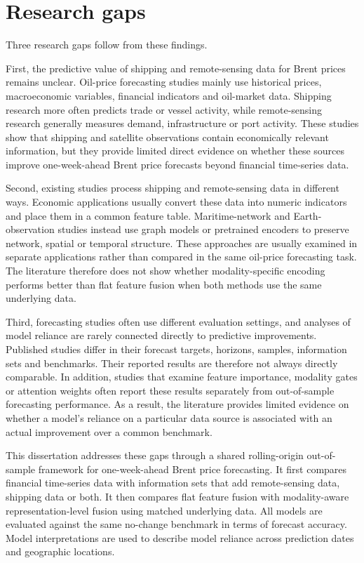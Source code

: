 \documentclass[
  british,
  12pt,
  oneside]{book}
\begin{document}
\section{Research gaps}\label{lit-gaps}

Three research gaps follow from these findings.

First, the predictive value of shipping and remote-sensing data for Brent prices remains unclear. Oil-price forecasting studies mainly use historical prices, macroeconomic variables, financial indicators and oil-market data. Shipping research more often predicts trade or vessel activity, while remote-sensing research generally measures demand, infrastructure or port activity. These studies show that shipping and satellite observations contain economically relevant information, but they provide limited direct evidence on whether these sources improve one-week-ahead Brent price forecasts beyond financial time-series data.

Second, existing studies process shipping and remote-sensing data in different ways. Economic applications usually convert these data into numeric indicators and place them in a common feature table. Maritime-network and Earth-observation studies instead use graph models or pretrained encoders to preserve network, spatial or temporal structure. These approaches are usually examined in separate applications rather than compared in the same oil-price forecasting task. The literature therefore does not show whether modality-specific encoding performs better than flat feature fusion when both methods use the same underlying data.

Third, forecasting studies often use different evaluation settings, and analyses of model reliance are rarely connected directly to predictive improvements. Published studies differ in their forecast targets, horizons, samples, information sets and benchmarks. Their reported results are therefore not always directly comparable. In addition, studies that examine feature importance, modality gates or attention weights often report these results separately from out-of-sample forecasting performance. As a result, the literature provides limited evidence on whether a model's reliance on a particular data source is associated with an actual improvement over a common benchmark.

This dissertation addresses these gaps through a shared rolling-origin out-of-sample framework for one-week-ahead Brent price forecasting. It first compares financial time-series data with information sets that add remote-sensing data, shipping data or both. It then compares flat feature fusion with modality-aware representation-level fusion using matched underlying data. All models are evaluated against the same no-change benchmark in terms of forecast accuracy. Model interpretations are used to describe model reliance across prediction dates and geographic locations.
\end{document}
